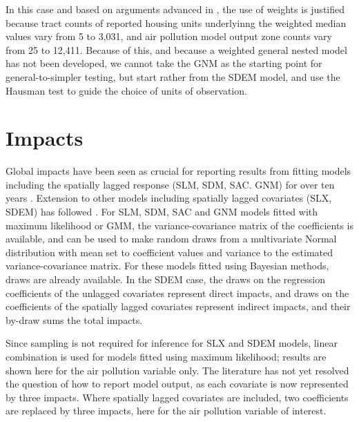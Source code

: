 \documentclass[]{book}
\newenvironment{Shaded}{\begin{snugshade}}{\end{snugshade}}
\newcommand{\CommentTok}[1]{\textcolor[rgb]{0.56,0.35,0.01}{\textit{#1}}}
\newcommand{\DataTypeTok}[1]{\textcolor[rgb]{0.13,0.29,0.53}{#1}}
\newcommand{\DecValTok}[1]{\textcolor[rgb]{0.00,0.00,0.81}{#1}}
\newcommand{\KeywordTok}[1]{\textcolor[rgb]{0.13,0.29,0.53}{\textbf{#1}}}
\newcommand{\NormalTok}[1]{#1}
\newcommand{\OperatorTok}[1]{\textcolor[rgb]{0.81,0.36,0.00}{\textbf{#1}}}
\newcommand{\StringTok}[1]{\textcolor[rgb]{0.31,0.60,0.02}{#1}}
\begin{document}
In this case and based on arguments advanced in \citet{bivand17}, the use of weights is justified because tract counts of reported housing units underlyinng the weighted median values vary from 5 to 3,031, and air pollution model output zone counts vary from 25 to 12,411. Because of this, and because a weighted general nested model has not been developed, we cannot take the GNM as the starting point for general-to-simpler testing, but start rather from the SDEM model, and use the Hausman test to guide the choice of units of observation.

\hypertarget{impacts}{%
\section{Impacts}\label{impacts}}

Global impacts have been seen as crucial for reporting results from fitting models including the spatially lagged response (SLM, SDM, SAC. GNM) for over ten years \citep{lesage+pace:09}. Extension to other models including spatially lagged covariates (SLX, SDEM) has followed \citep{elhorst:10, bivand:12, halleck-vega+elhorst:15}. For SLM, SDM, SAC and GNM models fitted with maximum likelihood or GMM, the variance-covariance matrix of the coefficients is available, and can be used to make random draws from a multivariate Normal distribution with mean set to coefficient values and variance to the estimated variance-covariance matrix. For these models fitted using Bayesian methods, draws are already available. In the SDEM case, the draws on the regression coefficients of the unlagged covariates represent direct impacts, and draws on the coefficients of the spatially lagged covariates represent indirect impacts, and their by-draw sums the total impacts.

Since sampling is not required for inference for SLX and SDEM models, linear combination is used for models fitted using maximum likelihood; results are shown here for the air pollution variable only. The literature has not yet resolved the question of how to report model output, as each covariate is now represented by three impacts. Where spatially lagged covariates are included, two coefficients are replaced by three impacts, here for the air pollution variable of interest.

\begin{Shaded}
\end{Shaded}
\end{document}
